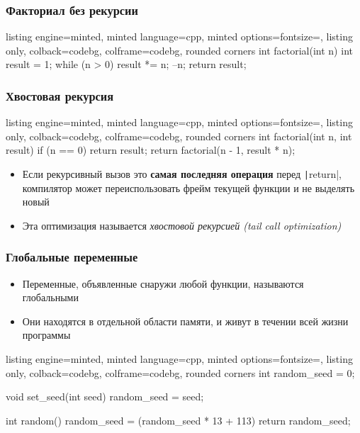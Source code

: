 \documentclass[10pt]{beamer}
\begin{document}
\begin{frame}[fragile]
\frametitle{Факториал без рекурсии}
\begin{tcblisting}{listing engine=minted, minted language=cpp, minted options={fontsize=\scriptsize}, listing only, colback=codebg, colframe=codebg, rounded corners}
int factorial(int n) {
  int result = 1;
  while (n > 0) {
    result *= n;
    --n;
  }
  return result;
}
\end{tcblisting}
\end{frame}

\begin{frame}[fragile]
\frametitle{Хвостовая рекурсия}
\begin{tcblisting}{listing engine=minted, minted language=cpp, minted options={fontsize=\scriptsize}, listing only, colback=codebg, colframe=codebg, rounded corners}
int factorial(int n, int result) {
  if (n == 0) {
    return result;
  }
  return factorial(n - 1, result * n);
}
\end{tcblisting}
\pause
{}
\begin{itemize}
\item Если рекурсивный вызов это \textbf{самая последняя операция} перед \texttt|return|, компилятор может переиспользовать фрейм текущей функции и не выделять новый
\pause
\item Эта оптимизация называется \textit{хвостовой рекурсией (tail call optimization)}
\end{itemize}
\end{frame}

\begin{frame}[fragile]
\frametitle{Глобальные переменные}
\begin{itemize}
\item Переменные, объявленные снаружи любой функции, называются глобальными
\pause
\item Они находятся в отдельной области памяти, и живут в течении всей жизни программы
\end{itemize}
\pause
{}
\begin{tcblisting}{listing engine=minted, minted language=cpp, minted options={fontsize=\scriptsize}, listing only, colback=codebg, colframe=codebg, rounded corners}
int random_seed = 0;

void set_seed(int seed) {
  random_seed = seed;
}

int random() {
  random_seed = (random_seed * 13 + 113) %
  return random_seed;
}
\end{tcblisting}
\end{frame}
\end{document}

